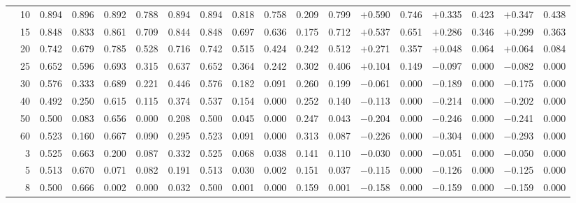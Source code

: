 \begin{table}[ht]
{\begin{tabular}{p{2.2cm}r rrrr rr rr rr rr rr rr}
  & 10 & 0.894 & 0.896 & 0.892 & 0.788 & 0.894 & 0.894 & 0.818 & 0.758 & 0.209 & 0.799 & $+$0.590 & 0.746 & $+$0.335 & 0.423 & $+$0.347 & 0.438 \\
  & 15 & 0.848 & 0.833 & 0.861 & 0.709 & 0.844 & 0.848 & 0.697 & 0.636 & 0.175 & 0.712 & $+$0.537 & 0.651 & $+$0.286 & 0.346 & $+$0.299 & 0.363 \\
  & 20 & 0.742 & 0.679 & 0.785 & 0.528 & 0.716 & 0.742 & 0.515 & 0.424 & 0.242 & 0.512 & $+$0.271 & 0.357 & $+$0.048 & 0.064 & $+$0.064 & 0.084 \\
  & 25 & 0.652 & 0.596 & 0.693 & 0.315 & 0.637 & 0.652 & 0.364 & 0.242 & 0.302 & 0.406 & $+$0.104 & 0.149 & $-$0.097 & 0.000 & $-$0.082 & 0.000 \\
  & 30 & 0.576 & 0.333 & 0.689 & 0.221 & 0.446 & 0.576 & 0.182 & 0.091 & 0.260 & 0.199 & $-$0.061 & 0.000 & $-$0.189 & 0.000 & $-$0.175 & 0.000 \\
  & 40 & 0.492 & 0.250 & 0.615 & 0.115 & 0.374 & 0.537 & 0.154 & 0.000 & 0.252 & 0.140 & $-$0.113 & 0.000 & $-$0.214 & 0.000 & $-$0.202 & 0.000 \\
  & 50 & 0.500 & 0.083 & 0.656 & 0.000 & 0.208 & 0.500 & 0.045 & 0.000 & 0.247 & 0.043 & $-$0.204 & 0.000 & $-$0.246 & 0.000 & $-$0.241 & 0.000 \\
  & 60 & 0.523 & 0.160 & 0.667 & 0.090 & 0.295 & 0.523 & 0.091 & 0.000 & 0.313 & 0.087 & $-$0.226 & 0.000 & $-$0.304 & 0.000 & $-$0.293 & 0.000 \\
\midrule
{}
  & 3  & 0.525 & 0.663 & 0.200 & 0.087 & 0.332 & 0.525 & 0.068 & 0.038 & 0.141 & 0.110 & $-$0.030 & 0.000 & $-$0.051 & 0.000 & $-$0.050 & 0.000 \\
  & 5  & 0.513 & 0.670 & 0.071 & 0.082 & 0.191 & 0.513 & 0.030 & 0.002 & 0.151 & 0.037 & $-$0.115 & 0.000 & $-$0.126 & 0.000 & $-$0.125 & 0.000 \\
  & 8  & 0.500 & 0.666 & 0.002 & 0.000 & 0.032 & 0.500 & 0.001 & 0.000 & 0.159 & 0.001 & $-$0.158 & 0.000 & $-$0.159 & 0.000 & $-$0.159 & 0.000 \\

\end{tabular}}
\end{table}
